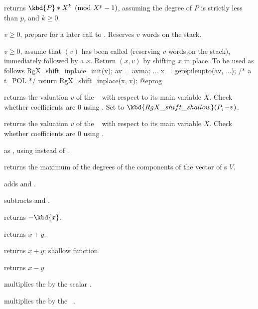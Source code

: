  returns $\kbd{P} * X^k
\pmod {X^p-1}$, assuming the degree of $P$ is strictly less than $p$, and
$k\geq 0$.

 $v \geq 0$, prepare for a later
call to . Reserves $v$ words on the stack.

 $v \geq 0$, assume that
$(v)$ has been called (reserving $v$ words on the
stack), immediately followed by a  $x$. Return $(x,v)$
by shifting $x$ in place. To be used as follows
\bprog
  RgX_shift_inplace_init(v);
  av = avma;
  ...
  x = gerepileupto(av, ...); /* a t_POL */
  return RgX_shift_inplace(x, v);
@eprog

 returns the valuation $v$ of the
~ with respect to its main variable $X$. Check whether
coefficients are $0$ using . Set  to
$\kbd{RgX\_shift\_shallow}(P,-v)$.

 returns the valuation $v$ of the
~ with respect to its main variable $X$. Check whether
coefficients are $0$ using .

 as , using
 instead of .

 returns the maximum of the degrees of
the components of the vector of s $V$.


 adds  and .

 subtracts  and .

 returns $-\kbd{x}$.

 returns $x+y$.

 returns $x+y$; shallow function.


 returns $x-y$

 multiplies the  
by the scalar .

 multiplies the  
by the ~.


